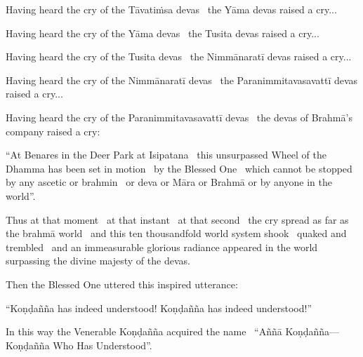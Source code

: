 \begin{english-only-hang}
  Having heard the cry of the Tāvatiṁsa devas \breathmark\ the Yāma devas raised a cry...
\end{english-only-hang}

\begin{english-only-hang}
  Having heard the cry of the Yāma devas \breathmark\ the Tusita devas raised a cry...
\end{english-only-hang}

\begin{english-only-hang}
  Having heard the cry of the Tusita devas \breathmark\ the Nimmānaratī devas raised a cry...
\end{english-only-hang}

\begin{english-only-hang}
  Having heard the cry of the Nimmānaratī devas \breathmark\ the Paranimmitavasavattī devas raised a cry...
\end{english-only-hang}

\begin{english-only-hang}
  Having heard the cry of the Paranimmitavasavattī devas \breathmark\ the devas of Brahmā's company raised a cry:
\end{english-only-hang}

\begin{english-only-hang}
  ``At Benares in the Deer Park at Isipatana \breathmark\ this unsurpassed Wheel of the Dhamma has been set in motion \breathmark\ by the Blessed One \breathmark\ which cannot be stopped by any ascetic or brahmin \breathmark\ or deva or Māra or Brahmā or by anyone in the world''.
\end{english-only-hang}

\begin{english-only-hang}
  Thus at that moment \breathmark\ at that instant \breathmark\ at that second \breathmark\ the cry spread as far as the brahmā world \breathmark\ and this ten thousandfold world system shook \breathmark\ quaked and trembled \breathmark\ and an immeasurable glorious radiance appeared in the world surpassing the divine majesty of the devas.
\end{english-only-hang}

\begin{english-only-hang}
  Then the Blessed One uttered this inspired utterance:
\end{english-only-hang}

\begin{english-only-hang}
  ``Koṇḍañña has indeed understood! Koṇḍañña has indeed understood!''
\end{english-only-hang}

\begin{english-only-hang}
  In this way the Venerable Koṇḍañña acquired the name \breathmark\ ``Aññā Koṇḍañña—Koṇḍañña Who Has Understood''.
\end{english-only-hang}

\suttaRef{[SN 56.11]}
